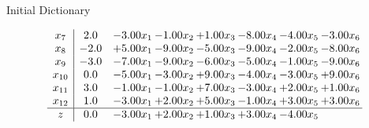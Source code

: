 \documentclass[8pt]{article}
\begin{document}
Initial Dictionary 

\[\begin{array}{c| c c@{\hskip 2pt} c@{\hskip 2pt} c@{\hskip 2pt} c@{\hskip 2pt} c@{\hskip 2pt} c@{\hskip 2pt} }
 x_{7}   &  2.0 & -3.00 x_{1} & -1.00 x_{2} & +  1.00 x_{3} & -8.00 x_{4} & -4.00 x_{5} & -3.00 x_{6}\\
 x_{8}   &  -2.0 & +  5.00 x_{1} & -9.00 x_{2} & -5.00 x_{3} & -9.00 x_{4} & -2.00 x_{5} & -8.00 x_{6}\\
 x_{9}   &  -3.0 & -7.00 x_{1} & -9.00 x_{2} & -6.00 x_{3} & -5.00 x_{4} & -1.00 x_{5} & -9.00 x_{6}\\
 x_{10}   &  0.0 & -5.00 x_{1} & -3.00 x_{2} & +  9.00 x_{3} & -4.00 x_{4} & -3.00 x_{5} & +  9.00 x_{6}\\
 x_{11}   &  3.0 & -1.00 x_{1} & -1.00 x_{2} & +  7.00 x_{3} & -3.00 x_{4} & +  2.00 x_{5} & +  1.00 x_{6}\\
 x_{12}   &  1.0 & -3.00 x_{1} & +  2.00 x_{2} & +  5.00 x_{3} & -1.00 x_{4} & +  3.00 x_{5} & +  3.00 x_{6}\\
\hline
z    &  0.0 & -3.00 x_{1} & +  2.00 x_{2} & +  1.00 x_{3} & +  3.00 x_{4} & -4.00 x_{5} &   \\
\end{array}\]
\end{document}
